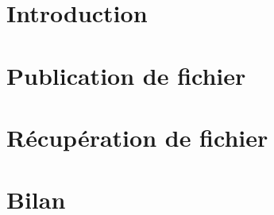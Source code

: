 \documentclass{article}
\title{\titre{}}
\author{Marie-Astrid Chanteloup, Milan Kania}
\date{Avril 2021}
\begin{document}

\newpage

\tableofcontents

\newpage
\section{Introduction}








\section{Publication de fichier}


\section{Récupération de fichier}



\newpage
\section{Bilan}

 
\end{document}

